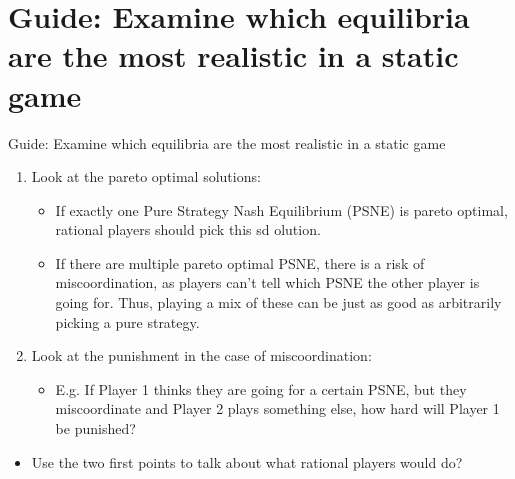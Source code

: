 \section{Guide: Examine which equilibria are the most realistic in a static game}

\begin{frame}{Guide: Examine which equilibria are the most realistic in a static game}
  \begin{multicols}{2}
    \begin{enumerate}
      \item Look at the pareto optimal solutions:\\
      \begin{itemize}
        \normalsize
          \item[a.] If exactly one Pure Strategy Nash Equilibrium (PSNE) is pareto optimal, rational players should pick this sd olution.
          \item[b.] If there are multiple pareto optimal PSNE, there is a risk of miscoordination, as players can't tell which PSNE the other player is going for. Thus, playing a mix of these can be just as good as arbitrarily picking a pure strategy.
      \end{itemize}
      \item Look at the punishment in the case of miscoordination:\\
      \begin{itemize}
        \normalsize
          \item E.g. If Player 1 thinks they are going for a certain PSNE, but they miscoordinate and Player 2 plays something else, how hard will Player 1 be punished?
      \end{itemize}
    \end{enumerate}
    \vfill\null \columnbreak
    \begin{itemize}
      \item[3.] Use the two first points to talk about what rational players would do?

\end{itemize}
\end{multicols}
\end{frame}
